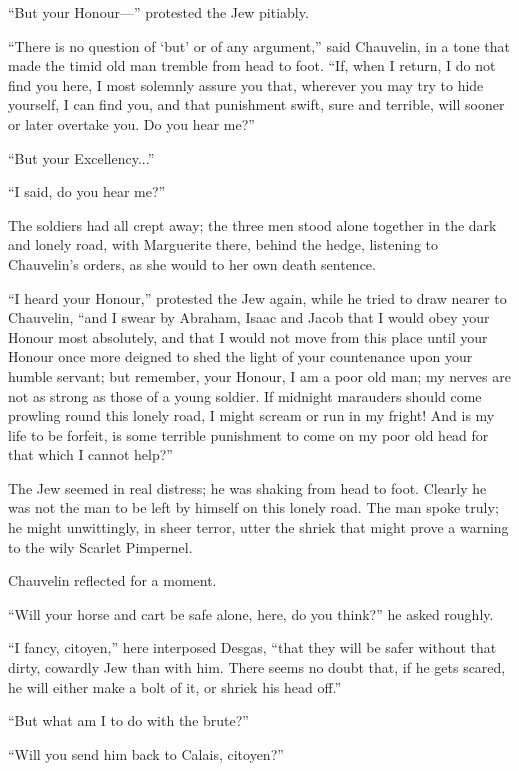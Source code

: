 \enquote{But your Honour---} protested the Jew pitiably.

\enquote{There is no question of \enquote{but} or of any argument,} said Chauvelin, in a tone that made the timid old man tremble from head to foot. \enquote{If, when I return, I do not find you here, I most solemnly assure you that, wherever you may try to hide yourself, I can find you, and that punishment swift, sure and terrible, will sooner or later overtake you. Do you hear me?}

\enquote{But your Excellency...}

\enquote{I said, do you hear me?}

The soldiers had all crept away; the three men stood alone together in the dark and lonely road, with Marguerite there, behind the hedge, listening to Chauvelin's orders, as she would to her own death sentence.

\enquote{I heard your Honour,} protested the Jew again, while he tried to draw nearer to Chauvelin, \enquote{and I swear by Abraham, Isaac and Jacob that I would obey your Honour most absolutely, and that I would not move from this place until your Honour once more deigned to shed the light of your countenance upon your humble servant; but remember, your Honour, I am a poor old man; my nerves are not as strong as those of a young soldier. If midnight marauders should come prowling round this lonely road, I might scream or run in my fright! And is my life to be forfeit, is some terrible punishment to come on my poor old head for that which I cannot help?}

The Jew seemed in real distress; he was shaking from head to foot. Clearly he was not the man to be left by himself on this lonely road. The man spoke truly; he might unwittingly, in sheer terror, utter the shriek that might prove a warning to the wily Scarlet Pimpernel.

Chauvelin reflected for a moment.

\enquote{Will your horse and cart be safe alone, here, do you think?} he asked roughly.

\enquote{I fancy, citoyen,} here interposed Desgas, \enquote{that they will be safer without that dirty, cowardly Jew than with him. There seems no doubt that, if he gets scared, he will either make a bolt of it, or shriek his head off.}

\enquote{But what am I to do with the brute?}

\enquote{Will you send him back to Calais, citoyen?}

